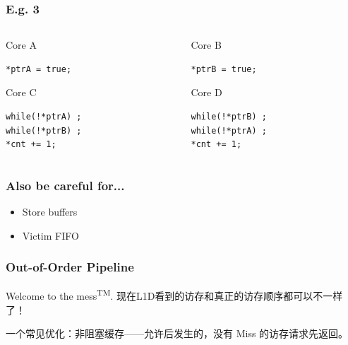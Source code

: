 \documentclass[UTF-8]{ctexbeamer}
\begin{document}
\begin{frame}[fragile]
  \frametitle{E.g. 3}
  \begin{columns}

    \begin{column}{0.5\textwidth}
      \begin{block}{Core A}
        \begin{verbatim}
*ptrA = true;
        \end{verbatim}
      \end{block}
      \begin{block}{Core C}
        \begin{verbatim}
while(!*ptrA) ;
while(!*ptrB) ;
*cnt += 1;
        \end{verbatim}
      \end{block}
    \end{column}

    \begin{column}{0.5\textwidth}
      \begin{block}{Core B}
        \begin{verbatim}
*ptrB = true;
        \end{verbatim}
      \end{block}
      \begin{block}{Core D}
        \begin{verbatim}
while(!*ptrB) ;
while(!*ptrA) ;
*cnt += 1;
        \end{verbatim}
      \end{block}
    \end{column}

  \end{columns}
\end{frame}

\begin{frame}
  \frametitle{Also be careful for...}

  \begin{itemize}
    \item Store buffers
    \item Victim FIFO
  \end{itemize}
\end{frame}

\begin{frame}
  \frametitle{Out-of-Order Pipeline}

  Welcome to the mess\textsuperscript{TM}.
  \pause
  现在L1D看到的访存和真正的访存顺序都可以不一样了！

  \pause
  \vspace{1em}

  一个常见优化：非阻塞缓存——允许后发生的，没有 Miss 的访存请求先返回。
\end{frame}
\end{document}
